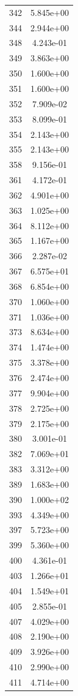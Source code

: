 \documentclass[12pt]{article}
\begin{document}
\begin{longtable}{@{}cc@{}}
342 & 5.845e+00 \\
344 & 2.944e+00 \\
348 & 4.243e-01 \\
349 & 3.863e+00 \\
350 & 1.600e+00 \\
351 & 1.600e+00 \\
352 & 7.909e-02 \\
353 & 8.099e-01 \\
354 & 2.143e+00 \\
355 & 2.143e+00 \\
358 & 9.156e-01 \\
361 & 4.172e-01 \\
362 & 4.901e+00 \\
363 & 1.025e+00 \\
364 & 8.112e+00 \\
365 & 1.167e+00 \\
366 & 2.287e-02 \\
367 & 6.575e+01 \\
368 & 6.854e+00 \\
370 & 1.060e+00 \\
371 & 1.036e+00 \\
373 & 8.634e+00 \\
374 & 1.474e+00 \\
375 & 3.378e+00 \\
376 & 2.474e+00 \\
377 & 9.904e+00 \\
378 & 2.725e+00 \\
379 & 2.175e+00 \\
380 & 3.001e-01 \\
382 & 7.069e+01 \\
383 & 3.312e+00 \\
389 & 1.683e+00 \\
390 & 1.000e+02 \\
393 & 4.349e+00 \\
397 & 5.723e+00 \\
399 & 5.360e+00 \\
400 & 4.361e-01 \\
403 & 1.266e+01 \\
404 & 1.549e+01 \\
405 & 2.855e-01 \\
407 & 4.029e+00 \\
408 & 2.190e+00 \\
409 & 3.926e+00 \\
410 & 2.990e+00 \\
411 & 4.714e+00 \\

\end{longtable}
\end{document}
